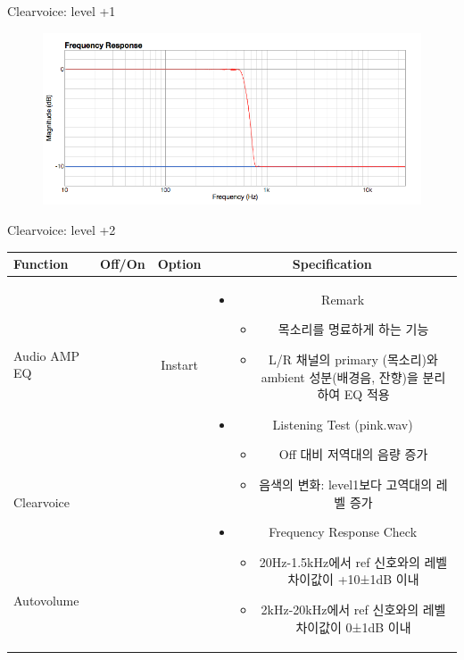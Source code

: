 \documentclass{beamer}
\begin{document}
\begin{frame}[t]{Clearvoice: level +1}
\begin{figure}[b]
\includegraphics[height=0.32\textwidth]{figure/cv1.png}
\end{figure}

\end{frame}


\begin{frame}[t]{Clearvoice: level +2}
\begin{tiny}
\begin{tabular}{@{}lccc@{}}
\toprule
Function & Off/On & Option & Specification \\
\midrule
Audio AMP EQ & \color{black}{Off} & Instart &
\multirow{14}{60mm}{
\begin{itemize}
\item Remark
	\begin{itemize}
	\item 목소리를 명료하게 하는 기능
	\item L/R 채널의 primary (목소리)와 ambient 성분(배경음, 잔향)을 분리하여 EQ 적용
	\end{itemize}
\item Listening Test (pink.wav)
	\begin{itemize}
	\item Off 대비 저역대의 음량 증가
	\item 음색의 변화: level1보다 고역대의 레벨 증가
	\end{itemize}
\item Frequency Response Check
  \begin{itemize}
  \item 20Hz-1.5kHz에서 ref 신호와의 레벨 차이값이 +10±1dB 이내
  \item 2kHz-20kHz에서 ref 신호와의 레벨 차이값이 0±1dB 이내
  \end{itemize}
\end{itemize}
} \\
Clearvoice & \color{blue}{On} & \color{blue}{+2} & \\
Autovolume & \color{black}{Off} & & \\

\end{tabular}
\end{tiny}
\end{frame}
\end{document}
